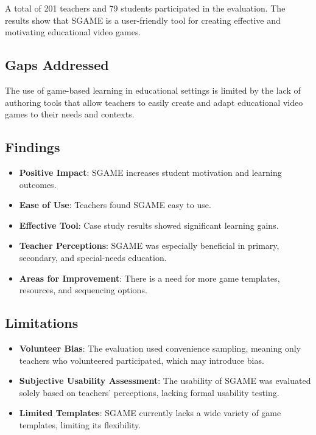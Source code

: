 A total of 201 teachers and 79 students participated in the evaluation. The results show that SGAME is a user-friendly tool for creating effective and motivating educational video games.

\subsection{Gaps Addressed}
The use of game-based learning in educational settings is limited by the lack of authoring tools that allow teachers to easily create and adapt educational video games to their needs and contexts.

\subsection{Findings}
\begin{itemize}
    \item \textbf{Positive Impact}: SGAME increases student motivation and learning outcomes.
    \item \textbf{Ease of Use}: Teachers found SGAME easy to use.
    \item \textbf{Effective Tool}: Case study results showed significant learning gains.
    \item \textbf{Teacher Perceptions}: SGAME was especially beneficial in primary, secondary, and special-needs education.
    \item \textbf{Areas for Improvement}: There is a need for more game templates, resources, and sequencing options.
\end{itemize}

\subsection{Limitations}
\begin{itemize}
    \item \textbf{Volunteer Bias}: The evaluation used convenience sampling, meaning only teachers who volunteered participated, which may introduce bias.
    \item \textbf{Subjective Usability Assessment}: The usability of SGAME was evaluated solely based on teachers' perceptions, lacking formal usability testing.
    \item \textbf{Limited Templates}: SGAME currently lacks a wide variety of game templates, limiting its flexibility.
\end{itemize}

